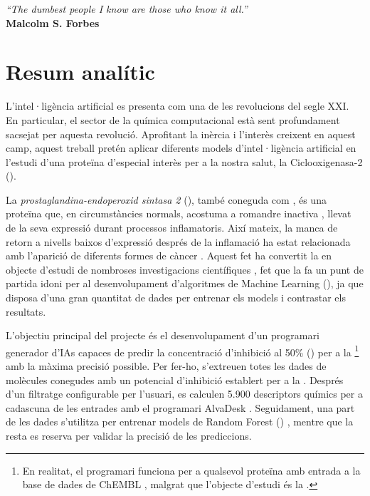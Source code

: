 \documentclass[11pt]{article}
\begin{document}
\restoregeometry
{}
\thispagestyle{empty}
\mbox{} 
\newpage
\thispagestyle{empty}
\vspace*{\fill} %
\begin{flushright}
    \emph{“The dumbest people I know are those who know it all.”}\\[1em]
    \textbf{Malcolm S. Forbes}
\end{flushright}
\vspace*{\fill} 
\newpage
\thispagestyle{empty}
\mbox{} 
\newpage

\thispagestyle{afteres}
\setcounter{page}{1}
\section*{Resum analític}\par
\hspace{0.55cm}L'intel·ligència artificial es presenta com una de les revolucions del segle XXI. En particular, el sector de la química computacional està sent profundament sacsejat per aquesta revolució. Aprofitant la inèrcia i l'interès creixent en aquest camp, aquest treball pretén aplicar diferents models d'intel·ligència artificial en l'estudi d'una proteïna d'especial interès per a la nostra salut, la Ciclooxigenasa-2 ().

La \emph{prostaglandina-endoperoxid sintasa 2} (), també coneguda com , és una proteïna que, en circumstàncies normals, acostuma a romandre inactiva \cite{Cox2Location}, llevat de la seva expressió durant processos inflamatoris. Així mateix, la manca de retorn a nivells baixos d'expressió després de la inflamació ha estat relacionada amb l'aparició de diferents formes de càncer \cite{DefinitionCOX2CancerDictionary}. Aquest fet ha convertit la  en objecte d'estudi de nombroses investigacions científiques \cite{Cox2InhibitorsReview}, fet que la fa un punt de partida idoni per al desenvolupament d'algoritmes de Machine Learning (), ja que disposa d'una gran quantitat de dades per entrenar els models i contrastar els resultats.

L'objectiu principal del projecte és el desenvolupament d'un programari generador d'IAs capaces de predir la concentració d'inhibició al 50\% () per a la \footnote{En realitat, el programari funciona per a qualsevol proteïna amb entrada a la base de dades de ChEMBL \cite{ChemblDatabase}, malgrat que l'objecte d'estudi és la .} amb la màxima precisió possible. Per fer-ho, s'extreuen totes les dades de molècules conegudes amb un potencial d'inhibició establert per a la . Després d'un filtratge configurable per l'usuari, es calculen 5.900 descriptors químics per a cadascuna de les entrades amb el programari AlvaDesk \cite{MauriMolecularDescriptorsBook}\cite{AlvaDescSecondPaper}. Seguidament, una part de les dades s'utilitza per entrenar models de Random Forest () \cite{MachineLearningRandomForest}, mentre que la resta es reserva per validar la precisió de les prediccions.
\end{document}
